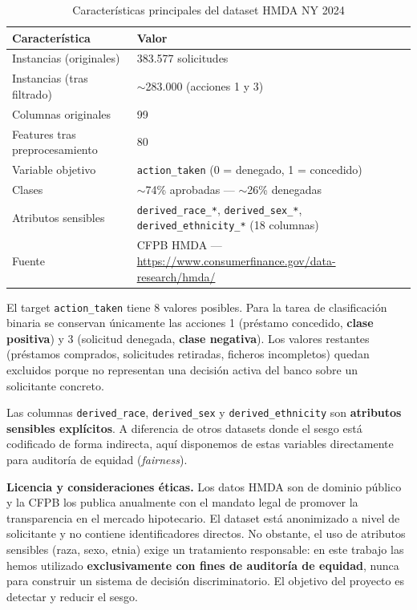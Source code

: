\documentclass[11pt,a4paper]{article}
\begin{document}
\begin{table}[ht]
\centering
\caption{Características principales del dataset HMDA NY 2024}
\label{tab:dataset_info}
\small
\begin{tabular}{@{}ll@{}}
\toprule
\textbf{Característica} & \textbf{Valor} \\ \midrule
Instancias (originales) & 383.577 solicitudes \\
Instancias (tras filtrado) & $\sim$283.000 (acciones 1 y 3) \\
Columnas originales & 99 \\
Features tras preprocesamiento & 80 \\
Variable objetivo & \texttt{action\_taken} (0 = denegado, 1 = concedido) \\
Clases & $\sim$74\% aprobadas --- $\sim$26\% denegadas \\
Atributos sensibles & \texttt{derived\_race\_*}, \texttt{derived\_sex\_*}, \texttt{derived\_ethnicity\_*} (18 columnas) \\
Fuente & CFPB HMDA --- \url{https://www.consumerfinance.gov/data-research/hmda/} \\ \bottomrule
\end{tabular}
\end{table}

El target \texttt{action\_taken} tiene 8 valores posibles. Para la tarea de clasificación binaria
se conservan únicamente las acciones 1 (préstamo concedido, \textbf{clase positiva}) y 3 (solicitud
denegada, \textbf{clase negativa}). Los valores restantes (préstamos comprados, solicitudes retiradas,
ficheros incompletos) quedan excluidos porque no representan una decisión activa del banco sobre
un solicitante concreto.

Las columnas \texttt{derived\_race}, \texttt{derived\_sex} y \texttt{derived\_ethnicity} son
\textbf{atributos sensibles explícitos}. A diferencia de otros datasets donde el sesgo está codificado
de forma indirecta, aquí disponemos de estas variables directamente para auditoría de equidad
(\textit{fairness}).

\medskip

\textbf{Licencia y consideraciones éticas.} Los datos HMDA son de dominio público y la CFPB los
publica anualmente con el mandato legal de promover la transparencia en el mercado hipotecario.
El dataset está anonimizado a nivel de solicitante y no contiene identificadores directos. No
obstante, el uso de atributos sensibles (raza, sexo, etnia) exige un tratamiento responsable: en
este trabajo las hemos utilizado \textbf{exclusivamente con fines de auditoría de equidad}, nunca para
construir un sistema de decisión discriminatorio. El objetivo del proyecto es detectar y reducir
el sesgo.
\end{document}
